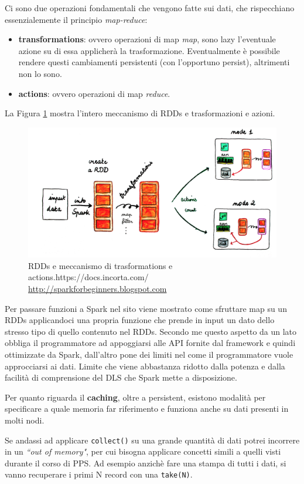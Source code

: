 \documentclass[12pt,italian]{article}
\begin{document}
\par Ci sono due operazioni fondamentali che vengono fatte sui dati, che rispecchiano essenzialemente il principio \textit{map-reduce}:
\begin{itemize}
	\item \textbf{transformations}: ovvero operazioni di map \textit{map}, sono lazy l'eventuale azione su di essa applicherà la trasformazione. Eventualmente è possibile rendere questi cambiamenti persistenti (con l'opportuno persist), altrimenti non lo sono.
	\item \textbf{actions}: ovvero operazioni di map \textit{reduce}.
\end{itemize}
La Figura \ref{fig:RDDs} mostra l'intero meccanismo di RDDs e trasformazioni e azioni.
\begin{figure}
	\centering 
	\includegraphics[width=1\linewidth]{img/rdds.png}
	\caption{RDDs e meccanismo di trasformations e actions.https://docs.incorta.com/ \url{http://sparkforbeginners.blogspot.com}}
	\label{fig:RDDs}
\end{figure}
\par Per passare funzioni a Spark nel sito viene mostrato come sfruttare map su un RDDs applicandoci una propria funzione che prende in input un dato dello stresso tipo di quello contenuto nel RDDs. Secondo me questo aspetto da un lato obbliga il programmatore ad appoggiarsi alle API fornite dal framework e quindi ottimizzate da Spark, dall'altro pone dei limiti nel come il programmatore vuole approcciarsi ai dati. Limite che viene abbastanza ridotto dalla potenza e dalla facilità di comprensione del DLS che Spark mette a disposizione.
\par Per quanto riguarda il \textbf{caching}, oltre a persistent, esistono modalità per specificare a quale memoria far riferimento e funziona anche su dati presenti in molti nodi.
\par Se andassi ad applicare \texttt{collect()} su una grande quantità di dati potrei incorrere in un \textit{``out of memory"}, per cui bisogna applicare concetti simili a quelli visti durante il corso di PPS. Ad esempio anzichè fare una stampa di tutti i dati, si vanno recuperare i primi N record con una \texttt{take(N)}.
\end{document}
